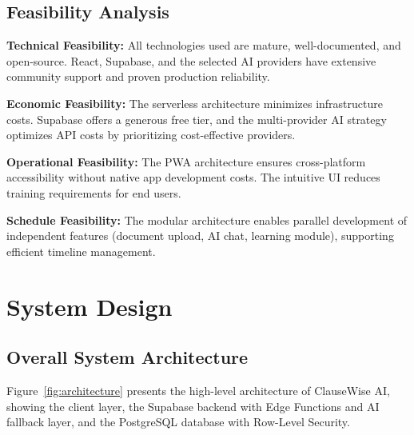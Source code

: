 \documentclass[12pt,a4paper,oneside]{report}
\begin{document}
\section{Feasibility Analysis}

\textbf{Technical Feasibility:} All technologies used are mature, well-documented, and open-source. React, Supabase, and the selected AI providers have extensive community support and proven production reliability.

\textbf{Economic Feasibility:} The serverless architecture minimizes infrastructure costs. Supabase offers a generous free tier, and the multi-provider AI strategy optimizes API costs by prioritizing cost-effective providers.

\textbf{Operational Feasibility:} The PWA architecture ensures cross-platform accessibility without native app development costs. The intuitive UI reduces training requirements for end users.

\textbf{Schedule Feasibility:} The modular architecture enables parallel development of independent features (document upload, AI chat, learning module), supporting efficient timeline management.

\chapter{System Design}

\section{Overall System Architecture}

Figure~\ref{fig:architecture} presents the high-level architecture of ClauseWise AI, showing the client layer, the Supabase backend with Edge Functions and AI fallback layer, and the PostgreSQL database with Row-Level Security.
\end{document}
